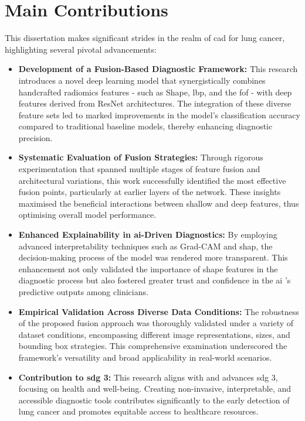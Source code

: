 \section{Main Contributions}

This dissertation makes significant strides in the realm of \ac{cad} for lung cancer, highlighting several pivotal advancements:

\begin{itemize}
    \item \textbf{Development of a Fusion-Based Diagnostic Framework:} This research introduces a novel deep learning model that synergistically combines handcrafted radiomics features - such as Shape, \ac{lbp}, and the \ac{fof} - with deep features derived from ResNet architectures. The integration of these diverse feature sets led to marked improvements in the model's classification accuracy compared to traditional baseline models, thereby enhancing diagnostic precision.

    \item \textbf{Systematic Evaluation of Fusion Strategies:} Through rigorous experimentation that spanned multiple stages of feature fusion and architectural variations, this work successfully identified the most effective fusion points, particularly at earlier layers of the network. These insights maximised the beneficial interactions between shallow and deep features, thus optimising overall model performance.

    \item \textbf{Enhanced Explainability in \ac{ai}-Driven Diagnostics:} By employing advanced interpretability techniques such as Grad-CAM and \ac{shap}, the decision-making process of the model was rendered more transparent. This enhancement not only validated the importance of shape features in the diagnostic process but also fostered greater trust and confidence in the \ac{ai} 's predictive outputs among clinicians.

    \item \textbf{Empirical Validation Across Diverse Data Conditions:} The robustness of the proposed fusion approach was thoroughly validated under a variety of dataset conditions, encompassing different image representations, sizes, and bounding box strategies. This comprehensive examination underscored the framework's versatility and broad applicability in real-world scenarios.

    \item \textbf{Contribution to \ac{sdg} 3:} This research aligns with and advances \ac{sdg} 3, focusing on health and well-being. Creating non-invasive, interpretable, and accessible diagnostic tools contributes significantly to the early detection of lung cancer and promotes equitable access to healthcare resources.
\end{itemize}

